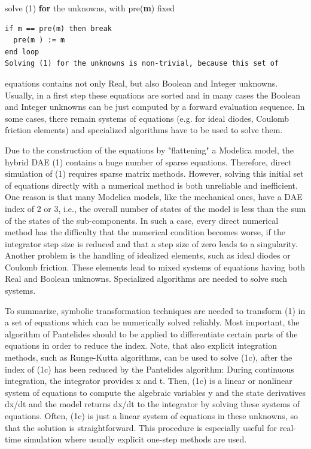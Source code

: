 \documentclass[10pt,a4paper]{report}
\begin{document}
solve (1) \textbf{for} the unknowns, with pre(\textbf{m}) fixed

\begin{lstlisting}[language=modelica]
if m == pre(m) then break
  pre(m ) := m
end loop
Solving (1) for the unknowns is non-trivial, because this set of
\end{lstlisting}
equations contains not only Real, but also Boolean and Integer unknowns.
Usually, in a first step these equations are sorted and in many cases
the Boolean and Integer unknowns can be just computed by a forward
evaluation sequence. In some cases, there remain systems of equations
(e.g. for ideal diodes, Coulomb friction elements) and specialized
algorithms have to be used to solve them.

Due to the construction of the equations by "flattening" a Modelica
model, the hybrid DAE (1) contains a huge number of sparse equations.
Therefore, direct simulation of (1) requires sparse matrix methods.
However, solving this initial set of equations directly with a numerical
method is both unreliable and inefficient. One reason is that many
Modelica models, like the mechanical ones, have a DAE index of 2 or 3,
i.e., the overall number of states of the model is less than the sum of
the states of the sub-components. In such a case, every direct numerical
method has the difficulty that the numerical condition becomes worse, if
the integrator step size is reduced and that a step size of zero leads
to a singularity. Another problem is the handling of idealized elements,
such as ideal diodes or Coulomb friction. These elements lead to mixed
systems of equations having both Real and Boolean unknowns. Specialized
algorithms are needed to solve such systems.

To summarize, symbolic transformation techniques are needed to transform
(1) in a set of equations which can be numerically solved reliably. Most
important, the algorithm of Pantelides should to be applied to
differentiate certain parts of the equations in order to reduce the
index. Note, that also explicit integration methods, such as Runge-Kutta
algorithms, can be used to solve (1c), after the index of (1c) has been
reduced by the Pantelides algorithm: During continuous integration, the
integrator provides x and t. Then, (1c) is a linear or nonlinear system
of equations to compute the algebraic variables y and the state
derivatives dx/dt and the model returns dx/dt to the integrator by
solving these systems of equations. Often, (1c) is just a linear system
of equations in these unknowns, so that the solution is straightforward.
This procedure is especially useful for real-time simulation where
usually explicit one-step methods are used.
\end{document}
